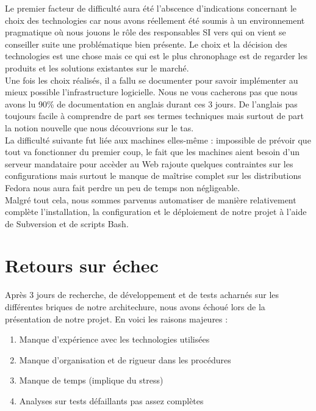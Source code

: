 \documentclass[11pt,a4paper]{report}
\begin{document}
            Le premier facteur de difficulté aura été l'abscence d'indications concernant le choix des technologies car nous avons réellement été soumis à un environnement pragmatique où nous jouons le rôle des responsables SI vers qui on vient se conseiller suite une problématique bien présente.
            Le choix et la décision des technologies est une chose mais ce qui est le plus chronophage est de regarder les produits et les solutions existantes sur le marché.\\
            
            Une fois les choix réalisés, il a fallu se documenter pour savoir implémenter au mieux possible l'infrastructure logicielle. Nous ne vous cacherons pas que nous avons lu 90\% de documentation en anglais durant ces 3 jours. De l'anglais pas toujours facile à comprendre de part ses termes techniques mais surtout de part la notion nouvelle que nous découvrions sur le tas.\\
            
            La difficulté suivante fut liée aux machines elles-même : impossible de prévoir que tout va fonctionner du premier coup, le fait que les machines aient besoin d'un serveur mandataire pour accèder au Web rajoute quelques contraintes sur les configurations mais surtout le manque de maîtrise complet sur les distributions Fedora nous aura fait perdre un peu de temps non négligeable.\\
            
            Malgré tout cela, nous sommes parvenus automatiser de manière relativement complète l'installation, la configuration et le déploiement de notre projet à l'aide de Subversion et de scripts Bash.
            
        \section{Retours sur échec}
            
            Après 3 jours de recherche, de développement et de tests acharnés sur les différentes briques de notre architechure, nous avons échoué lors de la présentation de notre projet. En voici les raisons majeures :\\
            
            \begin{enumerate}
                \item Manque d'expérience avec les technologies utilisées
                \item Manque d'organisation et de rigueur dans les procédures
                \item Manque de temps (implique du stress)
                \item Analyses sur tests défaillants pas assez complètes
            \end{enumerate}
            
\end{document}
